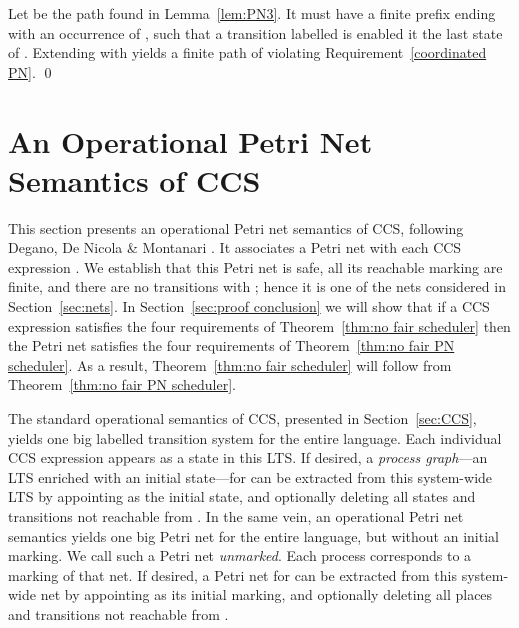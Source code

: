 \documentclass[smallcondensed]{svjour3}
\newcommand{\Thm}[1]{Theorem~\ref{thm:#1}}
\newcommand{\Lem}[1]{Lemma~\ref{lem:#1}}
\newcommand{\Sect}[1]{Section~\ref{sec:#1}}
\newcommand{\myref}[1]{\hyperlink{lab:#1}{\sc (#1)}\xspace}
\newcommand{\mand}{\&\xspace}
\begin{document}
\begin{trivlist}
\item[\hspace{\labelsep}{\bf Proof of \Thm{no fair PN scheduler}}]
Let  be the path found in \Lem{PN3}.
It must have a finite prefix  ending with an occurrence of , such that a transition 
labelled  is enabled it the last state of .
Extending  with  yields a finite path of  violating Requirement~\ref{coordinated PN}.
\qed
\end{trivlist}

\section{An Operational Petri Net Semantics of CCS}\label{sec:operational PN}


\newcommand{\weg}[1]{}
\newcommand{\src}{{\it src}}
\newcommand{\target}{{\it target}}
\newcommand{\shar}[1]{\mathord{\stackrel{#1}{\rightarrow}}}
\renewcommand{\myref}[1]{\hyperlink{lab:#1}{\sc (#1)}}

This section presents an operational Petri net semantics of CCS, following
Degano, De Nicola \mand Montanari \cite{DDM87}.
It associates a Petri net  with each CCS expression .
We establish that this Petri net is safe, all its reachable marking are
finite, and there are no transitions  with ;
hence it is one of the nets considered in \Sect{nets}. In \Sect{proof conclusion}
we will show that if a CCS expression  satisfies the four requirements of \Thm{no fair scheduler}
then the Petri net  satisfies the four requirements of \Thm{no fair PN scheduler}.
As a result, \Thm{no fair scheduler} will follow from \Thm{no fair PN scheduler}.

The standard operational semantics of CCS, presented in \Sect{CCS}, yields one big labelled
transition system for the entire language. Each individual CCS expression  appears as a state in
this LTS\@.  If desired, a \emph{process graph}---an LTS enriched with an initial state---for 
can be extracted from this system-wide LTS by appointing  as the initial state, and optionally
deleting all states and transitions not reachable from . In the same vein, an operational Petri
net semantics yields one big Petri net for the entire language, but without an initial marking.
We call such a Petri net {\em unmarked}. Each
process  corresponds to a marking  of that net. If desired, a Petri net
for  can be extracted from this system-wide net by appointing  as its initial marking,
and optionally deleting all places and transitions not reachable from .
\end{document}
